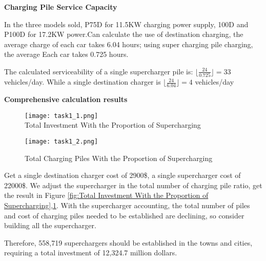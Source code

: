 \documentclass{mcmthesis}
\begin{document}
\textbf{Charging Pile Service Capacity}

\par In the three models sold, P75D for 11.5KW charging power supply, 100D and P100D for 17.2KW power.Can calculate the use of destination charging, the average charge of each car takes 6.04 hours; using super charging pile charging, the average Each car takes 0.725 hours.

\par The calculated serviceability of a single supercharger pile is: $ \lfloor \frac{24}{0.725}\rfloor = 33$ vehicles/day. While a single destination charger is $ \lfloor \frac{24}{6.04}\rfloor = 4 $ vehicles/day


\textbf{Comprehensive calculation results}



\begin{figure}[htbp]  
\begin{minipage}[t]{0.5\textwidth}
\centering  
\texttt{[image: task1\_1.png]} \\
\caption{Total Investment With the Proportion of Supercharging} \label{fig:Total Investment With the Proportion of Supercharging}
\end{minipage}
\hspace{1ex}
\begin{minipage}[t]{0.5\textwidth}  
\centering  
\texttt{[image: task1\_2.png]}\\
\caption{Total Charging Piles With the Proportion of Supercharging}  \label{fig:Total Charging Piles With the Proportion of Supercharging}
\end{minipage}  
\end{figure} 

\par Get a single destination charger cost of 2900\$, a single supercharger cost of 22000\$. We adjust the supercharger in the total number of charging pile ratio, get the result in Figure \ref{fig:Total Investment With the Proportion of Supercharging},\ref{fig:Total Charging Piles With the Proportion of Supercharging}. With the supercharger accounting, the total number of piles and cost of charging piles needed to be established are declining, so consider building all the supercharger.

\par Therefore, 558,719 superchargers should be established in the towns and cities, requiring a total investment of 12,324.7 million dollars.
\end{document}
